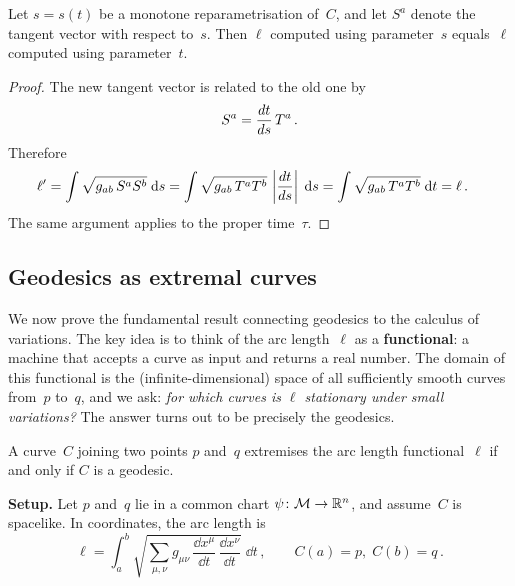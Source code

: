 \begin{theorem}%
\label{thm:reparam-invariance}
  Let $s = s(t)$ be a monotone reparametrisation of~$C$, and
  let $S^a$ denote the tangent vector with respect to~$s$.  Then
  $\ell$ computed using parameter~$s$ equals~$\ell$ computed
  using parameter~$t$.
\end{theorem}

\begin{proof}
  The new tangent vector is related to the old one by
  \[
    S^a = \frac{d t}{d s}\, T^a\,.
  \]
  Therefore
  \begin{align}
    \ell'
      &= \int \sqrt{g_{ab}\,S^a S^b}\;\mathrm{d} s
       = \int \sqrt{g_{ab}\,T^a T^b}\,
         \left|\frac{d t}{d s}\right|\;\mathrm{d} s
       = \int \sqrt{g_{ab}\,T^a T^b}\;\mathrm{d} t
       = \ell\,.
         \notag
  \end{align}
  The same argument applies to the proper time~$\tau$.
\end{proof}

\subsection{Geodesics as extremal curves}%
\label{sec:geodesics-extremal}

We now prove the fundamental result connecting geodesics to the
calculus of variations.  The key idea is to think of the arc
length~$\ell$ as a \textbf{functional}: a machine that accepts
a curve as input and returns a real number.  The domain of this
functional is the (infinite-dimensional) space of all
sufficiently smooth curves from~$p$ to~$q$, and we ask:
\emph{for which curves is $\ell$ stationary under small
variations?}  The answer turns out to be precisely the
geodesics.

\begin{theorem}%
\label{thm:geodesics-extremise}
  A curve~$C$ joining two points $p$ and~$q$ extremises the arc
  length functional~$\ell$ if and only if $C$ is a geodesic.
\end{theorem}

\noindent\textbf{Setup.}\;
Let $p$ and~$q$ lie in a common chart
$\psi\colon\mathcal{M}\to\mathbb{R}^{n}$, and assume~$C$ is spacelike.  In
coordinates, the arc length is
\begin{equation}\label{eq:arc-length-coord}
  \ell = \int_a^b
    \sqrt{\sum_{\mu,\nu}
      g_{\mu\nu}\,\frac{\dd x^\mu}{\dd t}\,
        \frac{\dd x^\nu}{\dd t}}
    \;\dd t\,,
  \qquad C(a)=p,\; C(b)=q\,.
\end{equation}

